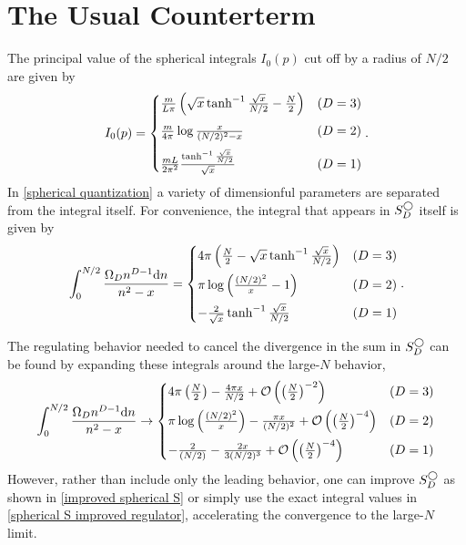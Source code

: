 \section{The Usual Counterterm}\label{sec:counterterm/spherical}

The principal value of the spherical integrals $I_0(p)$ cut off by a radius of $N/2$ are given by
\begin{equation}
    I_0(p) = \begin{cases}
        \frac{m}{L\pi}\left(\sqrt{x}\tanh^{-1}\frac{\sqrt{x}}{N/2} - \frac{N}{2}\right)
            &   (D=3)\\[0.25cm]
        \frac{m}{4\pi} \log \frac{x}{(N/2)^2-x}
            &   (D=2)\\[0.25cm]
        \frac{m L}{2\pi^2} \frac{\tanh^{-1} \frac{\sqrt{x}}{N/2}}{\sqrt{x}}                     &   (D=1)
    \end{cases}.
\end{equation}
In \eqref{spherical quantization} a variety of dimensionful parameters are separated from the integral itself.  For convenience, the integral that appears in $S_D^\bigcirc$ itself is given by
\begin{equation}
    \label{eq:spherical S improved regulator}
    \int_0^{N/2} \frac{\Omega_D n^{D-1} \mathrm{d}n}{n^2-x} = \begin{cases}
        4\pi\left( \frac{N}{2} - \sqrt{x} \tanh^{-1} \frac{\sqrt{x}}{N/2}\right)
            &   (D=3)\\[0.25cm]
        \pi \log\left( \frac{(N/2)^2}{x} - 1\right)
            &   (D=2)\\[0.25cm]
        -\frac{2}{\sqrt{x}} \tanh^{-1} \frac{\sqrt{x}}{N/2}                     &   (D=1)
    \end{cases}.
\end{equation}

The regulating behavior needed to cancel the divergence in the sum in $S_D^\bigcirc$ can be found by expanding these integrals around the large-$N$ behavior,
\begin{equation}
    \int_0^{N/2} \frac{\Omega_D n^{D-1} \mathrm{d}n}{n^2-x} \rightarrow \begin{cases}
        4\pi \left(\frac{N}{2}\right) - \frac{4 \pi x}{N/2} + \mathcal{O}\left(\left(\frac{N}{2}\right)^{-2}\right)
            &   (D=3)\\[0.25cm]
        \pi \log \left(\frac{(N/2)^2}{x}\right) - \frac{\pi x}{(N/2)^2} + \mathcal{O}\left(\left(\frac{N}{2}\right)^{-4}\right)
            &   (D=2)\\[0.25cm]
        -\frac{2}{(N/2)} - \frac{2 x}{3 (N/2)^3} + \mathcal{O}\left(\left(\frac{N}{2}\right)^{-4}\right)
            &   (D=1)
    \end{cases}
\end{equation}
However, rather than include only the leading behavior, one can improve $S_D^\bigcirc$ as shown in \eqref{improved spherical S} or simply use the exact integral values in \eqref{spherical S improved regulator}, accelerating the convergence to the large-$N$ limit.
